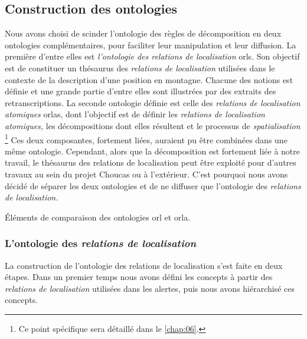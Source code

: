 \subsection{Construction des ontologies}


Nous avons choisi de scinder l'ontologie des règles de décomposition
en deux ontologies complémentaires, pour faciliter leur manipulation
et leur diffusion. La première d'entre elles est \emph{l'ontologie des
  relations de localisation} \acp{orl}. Son objectif est de constituer
un thésaurus des \emph{relations de localisation} utilisées dans le
contexte de la description d'une position en montagne. Chacune des
notions est définie et une grande partie d'entre elles sont illustrées
par des extraits des retranscriptions. La seconde ontologie définie
est celle des \emph{relations de localisation atomiques} \acp{orla},
dont l'objectif est de définir les \emph{relations de localisation
  atomiques,} les décompositions dont elles résultent et le processus
de \emph{spatialisation} \footnote{Ce point spécifique sera détaillé
  dans le \autoref{chap:06}.} Ces deux composantes, fortement liées,
auraient pu être combinées dans une même ontologie. Cependant, alors
que la décomposition est fortement liée à notre travail, le thésaurus
des relations de localisation peut être exploité pour d'autres travaux
au sein du projet Choucas ou à l'extérieur. C'est pourquoi nous avons
décidé de séparer les deux ontologies et de ne diffuser que
l'ontologie des \emph{relations de localisation.}

\begin{table}
  \centering
  
  \caption{Éléments de comparaison des ontologies \ac{orl} et
    \ac{orla}.}
  \label{tab:orl_vs_orla}
\end{table}

\subsubsection{L'ontologie des \emph{relations de localisation}}

La construction de l'ontologie des relations de localisation s'est
faite en deux étapes. Dans un premier temps nous avons défini les
concepts à partir des \emph{relations de localisation} utilisées dans
les alertes, puis nous avons hiérarchisé ces concepts.

